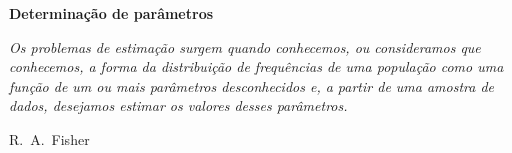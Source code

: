 \newpage
\thispagestyle{empty}



\vspace{1cm}
\hspace*{-0.5cm} {\huge \bf Determina\c{c}\~{a}o de par\^{a}metros} 


\setcounter{chapter}{5}
\setcounter{section}{0}
\setcounter{figure}{0}
\setcounter{table}{0}
\setcounter{equation}{0}
\label{Likeli}





\begin{flushright}
\begin{minipage}{8cm}
{\small
\baselineskip=8.5pt
{\it   Os problemas de estima\c{c}\~{a}o surgem quando conhecemos, ou consideramos que conhecemos, a forma da distribui\c{c}\~{a}o de frequ\^{e}ncias de uma popula\c{c}\~{a}o como uma fun\c{c}\~{a}o de um ou mais par\^{a}metros desconhecidos e,  a partir de uma amostra de dados, desejamos estimar os valores desses par\^{a}metros.}

\smallskip
\hfill R.~A.~Fisher
}
\end{minipage}
\end{flushright}





